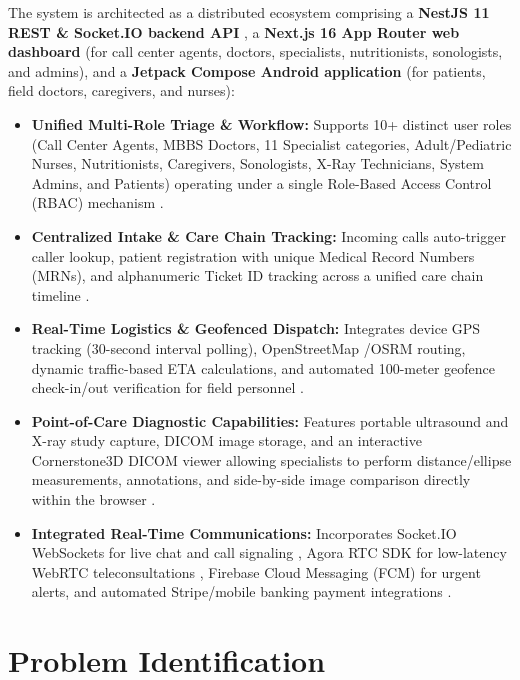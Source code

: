 \documentclass[lettersize,onecolumn,journal]{IEEEtran}
\begin{document}
	The system is architected as a distributed ecosystem comprising a \textbf{NestJS 11 REST \& Socket.IO backend API} \cite{nestjs_framework, fette2011websocket}, a \textbf{Next.js 16 App Router web dashboard} \cite{nextjs_app_router} (for call center agents, doctors, specialists, nutritionists, sonologists, and admins), and a \textbf{Jetpack Compose Android application} (for patients, field doctors, caregivers, and nurses):
	
	\begin{itemize}
		\item \textbf{Unified Multi-Role Triage \& Workflow:} Supports 10+ distinct user roles (Call Center Agents, MBBS Doctors, 11 Specialist categories, Adult/Pediatric Nurses, Nutritionists, Caregivers, Sonologists, X-Ray Technicians, System Admins, and Patients) operating under a single Role-Based Access Control (RBAC) mechanism \cite{srs2026, rbac_standard}.
		\item \textbf{Centralized Intake \& Care Chain Tracking:} Incoming calls auto-trigger caller lookup, patient registration with unique Medical Record Numbers (MRNs), and alphanumeric Ticket ID tracking across a unified care chain timeline \cite{srs2026}.
		\item \textbf{Real-Time Logistics \& Geofenced Dispatch:} Integrates device GPS tracking (30-second interval polling), OpenStreetMap \slash  OSRM routing, dynamic traffic-based ETA calculations, and automated 100-meter geofence check-in/out verification for field personnel \cite{zandbergen2009accuracy, haversine_formula, osrm_routing}.
		\item \textbf{Point-of-Care Diagnostic Capabilities:} Features portable ultrasound and X-ray study capture, DICOM image storage, and an interactive Cornerstone3D DICOM viewer allowing specialists to perform distance/ellipse measurements, annotations, and side-by-side image comparison directly within the browser \cite{dicom2021, pacs2001, cornerstone3d}.
		\item \textbf{Integrated Real-Time Communications:} Incorporates Socket.IO WebSockets for live chat and call signaling \cite{fette2011websocket}, Agora RTC SDK for low-latency WebRTC teleconsultations \cite{agorawebrtc}, Firebase Cloud Messaging (FCM) for urgent alerts, and automated Stripe/mobile banking payment integrations \cite{stripe2024api}.
	\end{itemize}
	
	\section{Problem Identification}
	
\end{document}
